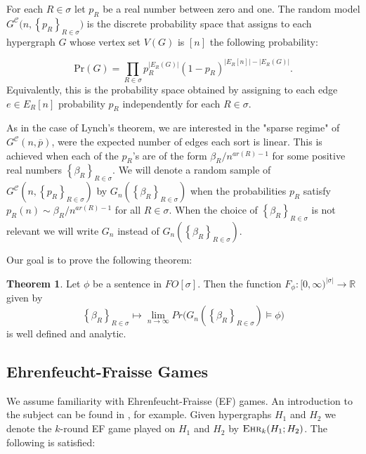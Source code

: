 \documentclass[12pt,notitlepage,a4paper]{article}
\theoremstyle{definition}
\newtheorem{theorem}{Theorem}[section]
\newcommand{\R}{\mathbb{R}}
\newcommand{\Ln}{\lim\limits_{n\to \infty}}
\newcommand{\ehr}{\textsc{Ehr}}
\newcommand{\InR}[1]{\left\{ #1_R \right\}_{R\in \sigma}}
\begin{document}
For each $R\in \sigma$ let
$p_R$ be a real number between zero and one.
The random model $G^{\mathcal{C}}\Big(n,\InR{p}\Big)$ 
is the discrete probability space that
assigns to each hypergraph $G$ whose vertex
set $V(G)$ is $[n]$ the following probability:

\[ \mathrm{Pr}(G)=\prod_{R\in \sigma} p_R^{|E_R(G)|}
(1-p_R)^{ \big|E_R[n]\big|-\big|E_R(G)\big|}.	
\]
Equivalently, this is the probability space obtained by 
assigning to each edge $e\in E_R[n]$ probability 
$p_R$ independently for each $R\in \sigma$. \par

As in the case of Lynch's theorem, we are interested in the
"sparse regime" of $G^\mathcal{C}(n,\overline{p})$, were the 
expected number of edges each sort is linear. 
This is achieved when each of the $p_R$'s are 
of the form $\beta_R/n^{ar(R)-1}$ for some 
positive real numbers $\InR{\beta}$.
We will denote a random sample of 
$G^\mathcal{C}\left(n,\left\{p_R\right\}_{R\in\sigma}\right)$
by $G_n\left(\InR{\beta}\right)$ when the probabilities $p_R$
satisfy $p_R(n)\sim \beta_R/n^{ar(R)-1}$ for all $R\in \sigma$.
When the choice of $\InR{\beta}$ is not relevant
we will write $G_n$ instead of 
$G_n\left(\InR{\beta}\right)$.\par

Our goal is to prove the following theorem:


\begin{theorem} \label{thm:main}
	Let $\phi$ be a sentence in $FO[\sigma]$. Then
	the function
	$F_\phi: [0,\infty)^{|\sigma|}
	\rightarrow \R$ given by 
	\[
	\InR{\beta} \mapsto \Ln Pr\big( G_n\left(
	\InR{\beta}\right) \models \phi\big)
	\]
	is well defined and analytic. 
\end{theorem}



\subsection{Ehrenfeucht-Fraisse Games}

We assume familiarity with Ehrenfeucht-Fraisse (EF) games.
An introduction to the subject can be found in
\cite[Section 2]{finitemodeltheory1}, for example. Given
hypergraphs $H_1$ and $H_2$ we denote the $k$-round EF game played 
on $H_1$ and
$H_2$ by $\ehr_k(H_1;H_2)$.
The following is satisfied:
\end{document}
